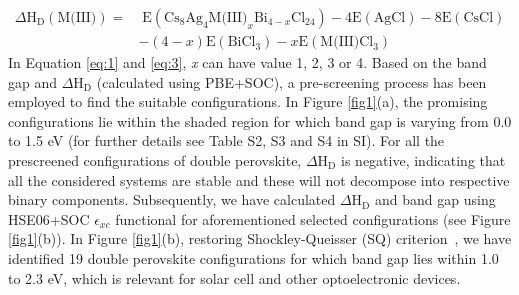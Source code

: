 \documentclass[journal=jpclcd,manuscript=letter]{achemso}
\begin{document}
\begin{equation} 
	\begin{split} 
	\Delta \textrm{H}_{\textrm{D}}(\textrm{M(III)}) = &\;  \textrm{E}\left(\textrm{Cs}_8\textrm{Ag}_4\textrm{M(III)}_x\textrm{Bi}_{4-x}\textrm{Cl}_{24}\right) - 4\textrm{E}\left(\textrm{Ag}\textrm{Cl}\right) - 8\textrm{E}\left(\textrm{Cs}\textrm{Cl}\right)\\ & - \left(4-x\right)\textrm{E}\left(\textrm{Bi}\textrm{Cl}_3\right) - x\textrm{E}\left(\textrm{M(III)}\textrm{Cl}_3\right)
	\label{eq:3}
	\end{split}
\end{equation}
In Equation \ref{eq:1} and \ref{eq:3}, \textit{x} can have value 1, 2, 3 or 4.
Based on the band gap and $\Delta$H$_{\textrm{D}}$ (calculated using PBE+SOC), a pre-screening process has been employed to find the suitable configurations. In Figure \ref{fig1}(a), the promising configurations lie within the shaded region for which band gap is varying from 0.0 to 1.5 eV (for further details see Table S2, S3 and S4 in SI). %
For all the prescreened configurations of double perovskite, $\Delta$H$_{\textrm{D}}$ is negative, indicating that all the considered systems are stable and these will not decompose into respective binary components.  
Subsequently, we have calculated $\Delta$H$_{\textrm{D}}$ and band gap using HSE06+SOC $\epsilon_{xc}$ functional for aforementioned selected configurations (see Figure \ref{fig1}(b)). In Figure \ref{fig1}(b), restoring Shockley-Queisser (SQ) criterion~\cite{shockley1961detailed}, we have identified 19 double perovskite configurations for which band gap lies within 1.0 to 2.3 eV, which is relevant for solar cell and other optoelectronic devices.
\end{document}
